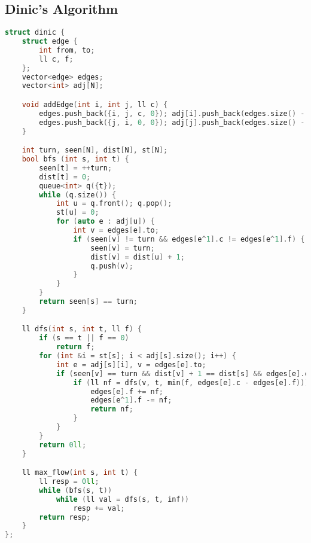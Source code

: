 \documentclass{article}
\begin{document}
\subsection{Dinic's Algorithm}
\begin{lstlisting}[language=C++]
struct dinic {
	struct edge {
		int from, to;
		ll c, f;
	};
	vector<edge> edges;
	vector<int> adj[N];

	void addEdge(int i, int j, ll c) {
		edges.push_back({i, j, c, 0}); adj[i].push_back(edges.size() - 1);
		edges.push_back({j, i, 0, 0}); adj[j].push_back(edges.size() - 1);
	}

	int turn, seen[N], dist[N], st[N];
	bool bfs (int s, int t) {
		seen[t] = ++turn;
		dist[t] = 0; 
		queue<int> q({t});
		while (q.size()) {
			int u = q.front(); q.pop();
			st[u] = 0;
			for (auto e : adj[u]) {
				int v = edges[e].to;
				if (seen[v] != turn && edges[e^1].c != edges[e^1].f) {
					seen[v] = turn;
					dist[v] = dist[u] + 1;
					q.push(v);
				}
			}
		}
		return seen[s] == turn;
	}

	ll dfs(int s, int t, ll f) {
		if (s == t || f == 0)
			return f;
		for (int &i = st[s]; i < adj[s].size(); i++) {
			int e = adj[s][i], v = edges[e].to;
			if (seen[v] == turn && dist[v] + 1 == dist[s] && edges[e].c > edges[e].f) {
				if (ll nf = dfs(v, t, min(f, edges[e].c - edges[e].f))) {
					edges[e].f += nf;
					edges[e^1].f -= nf;
					return nf;
				}
			}
		}
		return 0ll;
	}

	ll max_flow(int s, int t) {
		ll resp = 0ll;
		while (bfs(s, t))
			while (ll val = dfs(s, t, inf))
				resp += val;
		return resp;
	}
};
\end{lstlisting}
\end{document}
